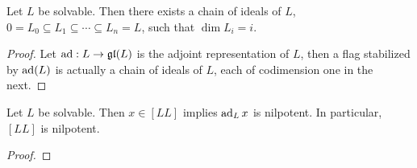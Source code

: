 \begin{corollary}
    Let $L$ be solvable. Then there exists a chain of ideals of $L$, $0=L_{0} \subseteq L_{1} \subseteq \cdots \subseteq L_{n}=L$, such that $\operatorname{dim}L_{i}=i$.
\end{corollary}
\begin{proof}
    Let $\operatorname{ad}:L\to \mathfrak{gl}(L)$ is the adjoint representation of $L$, then a flag stabilized by $\operatorname{ad}(L)$ is actually a chain of ideals of $L$, each of codimension one in the next.
\end{proof}

\begin{corollary}
    Let $L$ be solvable. Then $x\in [LL]$ implies $\operatorname{ad}_L x$ is nilpotent. In particular, $[LL]$ is nilpotent.
\end{corollary}
\begin{proof}
    
\end{proof}






























